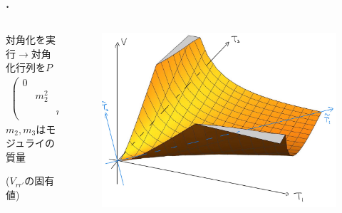 \documentclass[
  a4paper,uplatex,dvipdfmx,9pt,
  xcolor = {dvipsnames,svgnames},
  hyperref ={colorlinks=true,citecolor=Navy,linkcolor=NavyBlue,urlcolor=purple}
]{beamer}
\begin{document}
\begin{frame}
  \frametitle{\thesection.\thesubsection\ \subsecname}

  \vspace*{-0.6cm}

  \begin{columns}[t]    
    \begin{column}{0.49\textwidth} 
      \begin{center}
        対角化を実行$\rightarrow$対角化行列を$P$
        \begin{gather}
          \begin{pmatrix}
            0 & & \\
            & m_{2}^2 & \\
            & & m_{3}^2
          \end{pmatrix}
          \equiv
          P^{T}(V_{rr'})P
          \nonumber
        \end{gather}
        $m_{2},m_{3}$はモジュライの質量
        
        ($V_{rr'}$の固有値)
      \end{center}
    \end{column}
    \begin{column}{0.4\textwidth}  
      \begin{figure}[ht]
        \centering
        \includegraphics[keepaspectratio,width=0.8\linewidth]{fig/dterm_potential.jpg}         
      \end{figure}
    \end{column}
  \end{columns}

  \vspace{10pt}


\end{frame}
\end{document}
